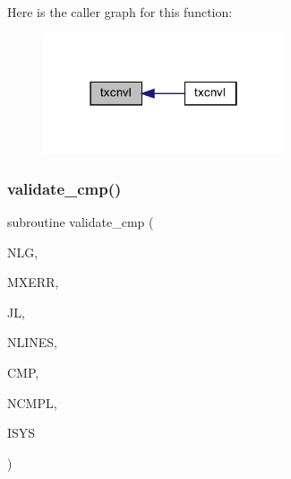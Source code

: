 Here is the caller graph for this function\+:\nopagebreak
\begin{figure}[H]
\begin{center}
\leavevmode
\includegraphics[width=202pt]{Leroi_8f90_a1cb0065a1b3068676ef2beb814db93f5_icgraph}
\end{center}
\end{figure}
\mbox{\label{Leroi_8f90_aa934c3b9754a6a8e18f83b6de33a0df8}} 
\subsubsection{\texorpdfstring{validate\+\_\+cmp()}{validate\_cmp()}}
{\footnotesize\ttfamily subroutine validate\+\_\+cmp (\begin{DoxyParamCaption}\item[{integer}]{N\+LG,  }\item[{integer}]{M\+X\+E\+RR,  }\item[{integer}]{JL,  }\item[{integer}]{N\+L\+I\+N\+ES,  }\item[{integer, dimension(nlines)}]{C\+MP,  }\item[{integer, dimension(nlines)}]{N\+C\+M\+PL,  }\item[{integer}]{I\+S\+YS }\end{DoxyParamCaption})}

